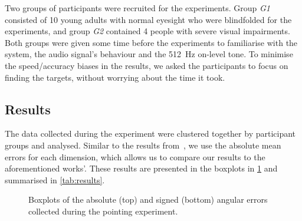 \documentclass{llncs}
\begin{document}
Two groups of participants were recruited for the experiments. 
Group \textit{G1} consisted of 10 young adults with normal eyesight who were blindfolded for the experiments, and group \textit{G2} contained 4 people with severe visual impairments. 
Both groups were given some time before the experiments to familiarise with the system, the audio signal's behaviour and the \SI{512}{\hertz} on-level tone. 
To minimise the speed/accuracy biases in the results, we asked the participants to focus on finding the targets, without worrying about the time it took. 

\subsection{Results}

The data collected during the experiment were clustered together by participant groups and analysed.
Similar to the results from~\cite{macdonald2006spatial,schonstein2008comparison}, we use the absolute mean errors for each dimension, which allows us to compare our results to the aforementioned works'. 
These results are presented in the boxplots in \cref{fig:err-results-fig} and summarised in \cref{tab:results}.

\begin{figure}
  \centering
\quad
  \caption{Boxplots of the absolute (top) and signed (bottom) angular errors collected during the pointing experiment. }\label{fig:err-results-fig}
\end{figure}
\end{document}
